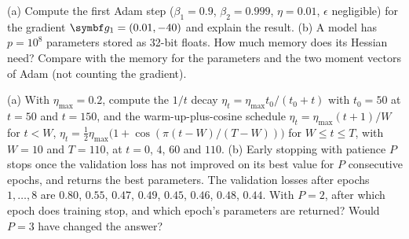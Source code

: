\documentclass[11pt]{article}
\newcommand{\gvec}{\vect{g}}
\begin{document}
\begin{questions}
\begin{calculations}
\item (a) Compute the first Adam step ($\beta_1 = 0.9$, $\beta_2 = 0.999$, $\eta = 0.01$, $\epsilon$ negligible) for
the gradient $\gvec_1 = (0.01, -40)$ and explain the result. (b) A model has $p = 10^8$ parameters stored as 32-bit
floats. How much memory does its Hessian need? Compare with the memory for the parameters and the two moment
vectors of Adam (not counting the gradient).
\item (a) With $\eta_{\max} = 0.2$, compute the $1/t$ decay $\eta_t = \eta_{\max}t_0/(t_0 + t)$ with $t_0 = 50$ at
$t = 50$ and $t = 150$, and the warm-up-plus-cosine schedule $\eta_t = \eta_{\max}(t + 1)/W$ for $t < W$,
$\eta_t = \frac12\eta_{\max}\big(1 + \cos(\pi(t - W)/(T - W))\big)$ for $W \le t \le T$, with $W = 10$ and $T = 110$, at
$t = 0$, $4$, $60$ and $110$. (b) Early stopping with patience $P$ stops once the validation loss has not improved on
its best value for $P$ consecutive epochs, and returns the best parameters. The validation losses after epochs
$1, \dots, 8$ are $0.80$, $0.55$, $0.47$, $0.49$, $0.45$, $0.46$, $0.48$, $0.44$. With $P = 2$, after which epoch does
training stop, and which epoch's parameters are returned? Would $P = 3$ have changed the answer?
\end{calculations}


\end{questions}
\end{document}
